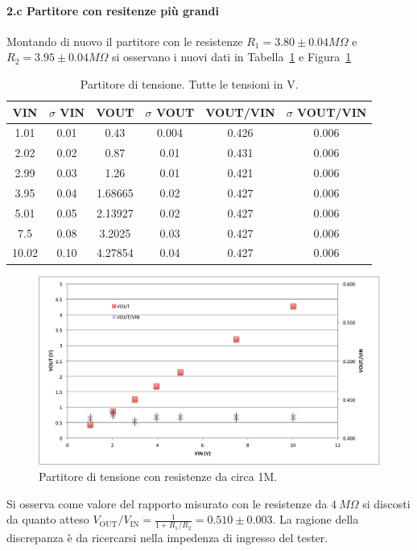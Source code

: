 \documentclass[10pt,a4paper]{article}
\begin{document}
\paragraph{2.c Partitore con resitenze pi\`u grandi}
Montando di nuovo il partitore con le resistenze $R_1 = 3.80\pm 0.04 M\Omega$ e $R_2 = 3.95\pm 0.04 M\Omega$ si osservano i nuovi dati in Tabella~\ref{t:par2} e Figura~\ref{f:par2}
\begin{table}[h]
\centering
\begin{tabular}{|c|c|c|c|c|c|}
\hline 
VIN& $\sigma$ VIN  &VOUT	 & $\sigma$ VOUT& VOUT/VIN & $\sigma$ VOUT/VIN \\
\hline 
1.01&0.01&0.43&0.004&0.426&0.006\\
2.02&0.02&0.87&0.01&0.431&0.006\\
2.99&0.03&1.26&0.01&0.421&0.006\\
3.95&0.04&1.68665&0.02&0.427&0.006\\
5.01&0.05&2.13927&0.02&0.427&0.006\\
7.5&0.08&3.2025&0.03&0.427&0.006\\
10.02&0.10&4.27854&0.04&0.427&0.006\\
\hline 
\end{tabular} 
\caption{Partitore di tensione. Tutte le tensioni in V.\label{t:par2}}
\end{table}
\begin{figure}
\centering
\includegraphics[scale=0.4]{part2.pdf}
\caption{Partitore di tensione con resistenze da circa 1M.\label{f:par2}}
\end{figure}

Si osserva come valore del rapporto misurato con le resistenze da $4~M\Omega$ si discosti da quanto atteso   $V_\mathrm{OUT}/V_\mathrm{IN} = \frac{1}{1+R_1/R_2}= 0.510\pm 0.003 $. La ragione della discrepanza \`e da ricercarsi nella impedenza di ingresso del tester.
\end{document}
